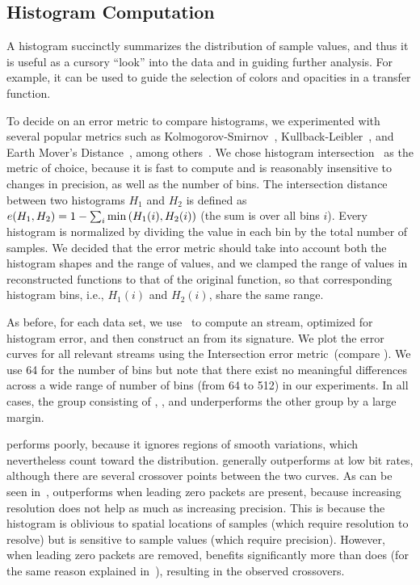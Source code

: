 \subsection{Histogram Computation}\label{sec:histogram}

A histogram succinctly summarizes the distribution of sample values, and thus it is useful as a
cursory ``look'' into the data and in guiding further analysis. For example, it can be used to guide
the selection of colors and opacities in a transfer function.

To decide on an error metric to compare histograms, we experimented with several popular metrics
such as Kolmogorov-Smirnov~\cite{smirnov1948}, Kullback-Leibler~\cite{kullback1951}, and Earth
Mover's Distance~\cite{emd1998}, among others~\cite{Hellinger1909,Bhattacharyya1943}. We chose
histogram intersection~\cite{histogram_intersection1991} as the metric of choice, because it is fast
to compute and is reasonably insensitive to changes in precision, as well as the number of bins. The
intersection distance between two histograms $H_1$ and $H_2$ is defined as
$e(H_1,H_2)=1-\sum_{i}{\min{(H_1(i),H_2(i))}}$ (the sum is over all bins $i$). Every histogram is
normalized by dividing the value in each bin by the total number of samples. We decided that the
error metric should take into account both the histogram shapes and the range of values, and we
clamped the range of values in reconstructed functions to that of the original function, so that
corresponding histogram bins, i.e., $H_1(i)$ and $H_2(i)$, share the same range.

As before, for each data set, we use~ to compute an \shop stream, optimized for
histogram error, and then construct an \shsg from its signature. We plot the error curves for all
relevant streams using the Intersection error metric~(compare
). We use 64 for the number of bins but note that there exist
no meaningful differences across a wide range of number of bins (from 64 to 512) in our experiments.
In all cases, the group consisting of \sbit, \slvl, and \smag underperforms the other group by a
large margin.

\smag performs poorly, because it ignores regions of smooth variations, which nevertheless count
toward the distribution. \slvl generally outperforms \sbit at low bit rates, although there are
several crossover points between the two curves. As can be seen in~,
\slvl outperforms \sbit when leading zero packets are present, because increasing resolution does
not help as much as increasing precision. This is because the histogram is oblivious to spatial
locations of samples (which require resolution to resolve) but is sensitive to sample values (which
require precision). However, when leading zero packets are removed, \sbit benefits significantly
more than \slvl does (for the same reason explained in~), resulting in the
observed crossovers.

